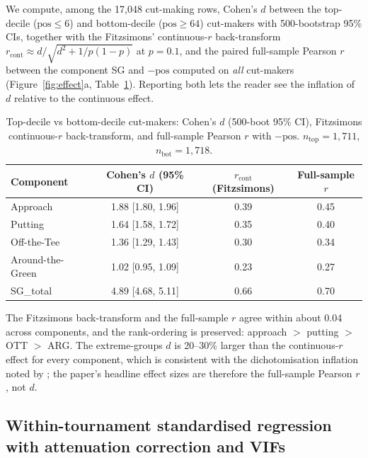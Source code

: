 \documentclass[11pt]{article}
\begin{document}
We compute, among the 17{,}048 cut-making rows, Cohen's $d$ between the top-decile ($\text{pos} \le 6$) and bottom-decile ($\text{pos} \ge 64$) cut-makers with 500-bootstrap 95\% CIs, together with the Fitzsimons' \citep{fitzsimons2008death,hunter1990methods} continuous-$r$ back-transform $r_\text{cont} \approx d/\sqrt{d^2 + 1/p(1-p)}$ at $p = 0.1$, and the paired full-sample Pearson $r$ between the component SG and $-\text{pos}$ computed on \emph{all} cut-makers (Figure~\ref{fig:effect}a, Table~\ref{tab:effect}).  Reporting both lets the reader see the inflation of $d$ relative to the continuous effect.

\begin{table}[t]
\centering
\small
\caption{Top-decile vs bottom-decile cut-makers: Cohen's $d$ (500-boot 95\% CI), Fitzsimons continuous-$r$ back-transform, and full-sample Pearson $r$ with $-\text{pos}$.  $n_\text{top}=1{,}711$, $n_\text{bot}=1{,}718$.}
\label{tab:effect}
\begin{tabular}{lccc}
\toprule
Component & Cohen's $d$ (95\% CI) & $r_\text{cont}$ (Fitzsimons) & Full-sample $r$ \\
\midrule
Approach          & 1.88 [1.80, 1.96] & 0.39 & 0.45 \\
Putting           & 1.64 [1.58, 1.72] & 0.35 & 0.40 \\
Off-the-Tee       & 1.36 [1.29, 1.43] & 0.30 & 0.34 \\
Around-the-Green  & 1.02 [0.95, 1.09] & 0.23 & 0.27 \\
\midrule
SG\_total         & 4.89 [4.68, 5.11] & 0.66 & 0.70 \\
\bottomrule
\end{tabular}
\end{table}

The Fitzsimons back-transform and the full-sample $r$ agree within about 0.04 across components, and the rank-ordering is preserved: approach $>$ putting $>$ OTT $>$ ARG.  The extreme-groups $d$ is 20--30\% larger than the continuous-$r$ effect for every component, which is consistent with the dichotomisation inflation noted by \citet{hunter1990methods}; the paper's headline effect sizes are therefore the full-sample Pearson $r$, not $d$.

\subsection{Within-tournament standardised regression with attenuation correction and VIFs}
\end{document}
